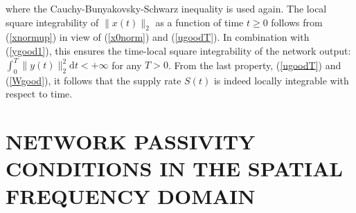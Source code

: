 \documentclass[letterpaper, 10pt, conference]{ieeeconf}  %
\def\>{\geqslant}           %
\def\rd{\mathrm{d}}        %
\begin{document}
where the Cauchy-Bunyakovsky-Schwarz inequality is used again. The local square integrability of $\|x(t)\|_2$ as a function of time $t\>0$ follows from (\ref{xnormup})  in view of (\ref{x0norm}) and (\ref{ugoodT}). In combination with (\ref{ygood1}), this ensures the time-local square integrability of the network output: $  \int_0^T
  \|y(t)\|_2^2\rd t <+\infty$ for any $T>0$. From the last property, (\ref{ugoodT}) and (\ref{Wgood}), it follows that the supply rate $S(t)$ is indeed locally integrable with respect to time.





\section{NETWORK PASSIVITY CONDITIONS IN THE SPATIAL FREQUENCY DOMAIN}\label{sec:pass}
\end{document}
